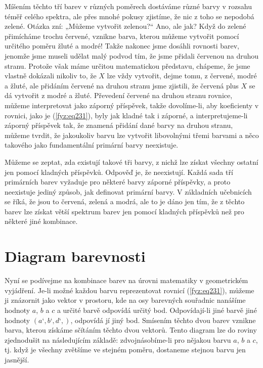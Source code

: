     Míšením těchto tří barev v různých poměrech dostáváme různé barvy v rozsahu téměř celého 
    spektra, ale přes mnohé pokusy zjistíme, že nic z toho se nepodobá zelené. Otázka zní: „Můžeme 
    vytvořit zelenou?“ Ano, ale jak? Když do zelené přimícháme trochu červené, vznikne barva, 
    kterou můžeme vytvořit pomocí určitého poměru žluté a modré! Takže nakonec jsme dosáhli 
    rovnosti barev, jenomže jsme museli udělat malý podvod tím, že jsme přidali červenou na druhou 
    stranu. Protože však máme určitou matematickou představu, chápeme, že jsme vlastně dokázali 
    nikoliv to, že \(X\) lze vždy vytvořit, dejme tomu, z červené, modré a žluté, ale přidáním 
    červené na druhou stranu jsme zjistili, že červená plus \(X\) se dá vytvořit z modré a žluté. 
    Převedení červené na druhou stranu rovnice, můžeme interpretovat jako záporný příspěvek, takže 
    dovolíme-li, aby koeficienty v rovnici, jako je (\ref{fyz:eq231}), byly jak kladné tak i 
    záporné, a interpretujeme-li záporný příspěvek tak, že znamená přidání dané barvy na druhou 
    stranu, můžeme tvrdit, že jakoukoliv barvu lze vytvořit libovolnými třemi barvami a něco 
    takového jako fundamentální primární barvy neexistuje.
    
    Můžeme se zeptat, zda existují takové tři barvy, z nichž lze získat všechny ostatní jen pomocí 
    kladných příspěvků. Odpověď je, že neexistují. Každá sada tří primárních barev vyžaduje pro 
    některé barvy záporné příspěvky, a proto neexistuje jediný způsob, jak definovat primární barvy.
    V základních učebnicích se říká, že jsou to červená, zelená a modrá, ale to je dáno jen tím, že 
    z těchto barev lze získat větší spektrum barev jen pomocí kladných příspěvků než pro některé 
    jiné kombinace.
    
  \section{Diagram barevnosti}\label{fyz:IchapXXXVsecIV}
    Nyní se podívejme na kombinace barev na úrovni matematiky v geometrickém vyjádření. Je-li možné 
    každou barvu reprezentovat rovnicí (\ref{fyz:eq231}), můžeme ji znázornit jako vektor v 
    prostoru, kde na osy barevných souřadnic nanášíme hodnoty \(a\), \(b\) a \(c\) a určité barvě 
    odpovídá určitý bod. Odpovídají-li jiné barvě jiné hodnoty \((a‘, b‘, d‘,)\), odpovídá jí jiný 
    bod. Smísením těchto dvou barev vznikne barva, kterou získáme sčítáním těchto dvou vektorů. 
    Tento diagram lze do roviny zjednodušit na následujícím základě: zdvojnásobíme-li pro nějakou 
    barvu \(a\), \(b\) a \(c\), tj. když je všechny zvětšíme ve stejném poměru, dostaneme stejnou 
    barvu jen jasnější.
    
